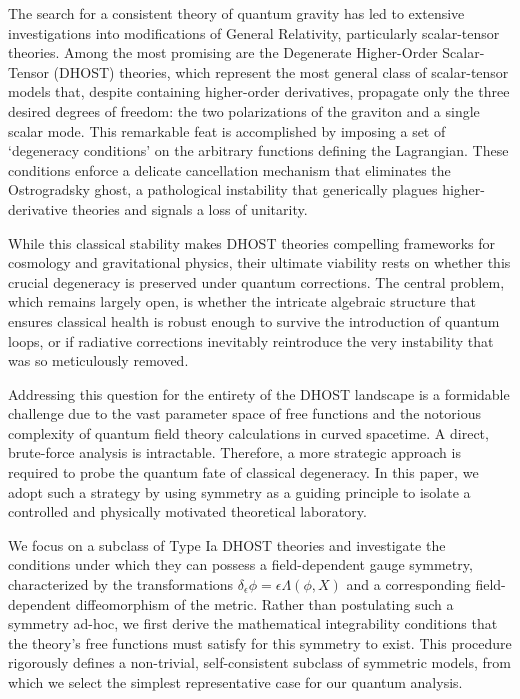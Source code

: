 \documentclass[twocolumn]{aastex631}
\begin{document}
The search for a consistent theory of quantum gravity has led to extensive investigations into modifications of General Relativity, particularly scalar-tensor theories. Among the most promising are the Degenerate Higher-Order Scalar-Tensor (DHOST) theories, which represent the most general class of scalar-tensor models that, despite containing higher-order derivatives, propagate only the three desired degrees of freedom: the two polarizations of the graviton and a single scalar mode. This remarkable feat is accomplished by imposing a set of `degeneracy conditions' on the arbitrary functions defining the Lagrangian. These conditions enforce a delicate cancellation mechanism that eliminates the Ostrogradsky ghost, a pathological instability that generically plagues higher-derivative theories and signals a loss of unitarity.

While this classical stability makes DHOST theories compelling frameworks for cosmology and gravitational physics, their ultimate viability rests on whether this crucial degeneracy is preserved under quantum corrections. The central problem, which remains largely open, is whether the intricate algebraic structure that ensures classical health is robust enough to survive the introduction of quantum loops, or if radiative corrections inevitably reintroduce the very instability that was so meticulously removed.

Addressing this question for the entirety of the DHOST landscape is a formidable challenge due to the vast parameter space of free functions and the notorious complexity of quantum field theory calculations in curved spacetime. A direct, brute-force analysis is intractable. Therefore, a more strategic approach is required to probe the quantum fate of classical degeneracy. In this paper, we adopt such a strategy by using symmetry as a guiding principle to isolate a controlled and physically motivated theoretical laboratory.

We focus on a subclass of Type Ia DHOST theories and investigate the conditions under which they can possess a field-dependent gauge symmetry, characterized by the transformations $\delta_\epsilon \phi = \epsilon \Lambda(\phi, X)$ and a corresponding field-dependent diffeomorphism of the metric. Rather than postulating such a symmetry ad-hoc, we first derive the mathematical integrability conditions that the theory's free functions must satisfy for this symmetry to exist. This procedure rigorously defines a non-trivial, self-consistent subclass of symmetric models, from which we select the simplest representative case for our quantum analysis.
\end{document}
